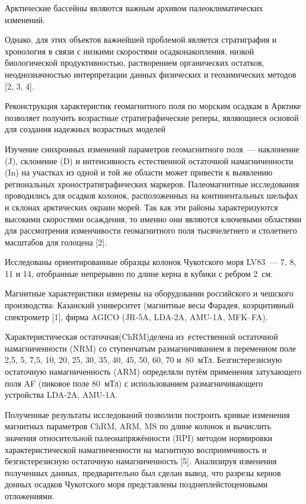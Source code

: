  

\makeProcTitle
{}

Арктические бассейны являются важным архивом палеоклиматических
изменений.

Однако, для этих объектов важнейшей проблемой является стратиграфия и
хронология в связи с низкими скоростями осадконакопления, низкой
биологической продуктивностью, растворением органических остатков,
неоднозначностью интерпретации данных физических и геохимических методов
[2, 3, 4].

Реконструкция характеристик геомагнитного поля по морским осадкам в
Арктике позволяет получить возрастные стратиграфические реперы,
являющиеся основой для создания надежных возрастных моделей

Изучение синхронных изменений параметров геомагнитного поля~--- наклонение (J), склонение (D) и интенсивность естественной остаточной намагниченности (In) на участках из одной и той же области может привести к выявлению региональных хроностратиграфических маркеров. Палеомагнитные исследования проводились для осадков колонок, расположенных на континентальных шельфах и склонах арктических окраин морей. Так как эти районы характеризуются высокими скоростями осаждения, то именно они являются ключевыми областями для рассмотрения изменчивости геомагнитного поля тысячелетнего и столетнего масштабов для голоцена [2].

Исследованы ориентированные образцы колонок Чукотского моря LV83~--- 7, 8,
11 и 14, отобранные непрерывно по длине керна в кубики с ребром 2~см.

Магнитные характеристики измерены на оборудовании российского и чешского
производства: Казанский университет (магнитные весы Фарадея,
коэрцитивный спектрометр [1], фирма AGICO (JR-5A, LDA-2A, AMU-1A,
MFK–FA).

Характеристическая остаточная (ChRM)\-де\-ле\-на из~ес\-тест\-вен\-ной остаточной намагниченности (NRM) со ступенчатым размагничиванием в переменном поле 2,5, 5, 7,5, 10, 20, 25, 30, 35, 40, 45, 50, 60, 70 и~80~мТл. Безгистерезисную остаточную намагниченность (ARM) определяли путём применения затухающего поля AF (пиковое поле 80~мТл) с использованием размагничивающего устройства LDA-2A, AMU-1A.

Полученные результаты  исследований позволили построить кривые изменения магнитных параметров  ChRM, ARM, MS по длине колонок и вычислить значения относительной палеонапряжённости (RPI) методом нормировки характеристической намагниченности на магнитную восприимчивость и безгистерезисную остаточную намагниченность [5]. Анализируя изменения полученных данных, предварительно был сделан вывод, что разрезы кернов донных осадков Чукотского моря представлены позднеплейстоценовыми отложениями.



